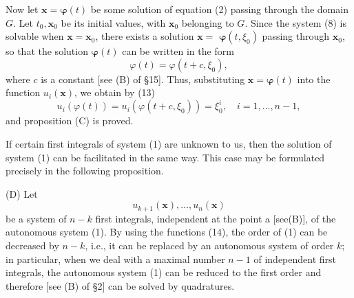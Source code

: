 \documentclass[10pt,a5paper]{book}
\theoremstyle{plain}
\theoremstyle{definition}
\theoremstyle{remark}
\begin{document}
Now let $\mathbf{x}=\boldsymbol{\varphi}(t)$ be some solution of equation (2) passing through the domain $G$. Let $t_{0}, \mathbf{x}_{0}$ be its initial values, with $\mathbf{x}_{0}$ belonging to $G$. Since the system (8) is solvable when $\mathbf{x}=\mathbf{x}_{0}$, there exists a solution $\mathbf{x}=$ $\boldsymbol{\varphi}\left(t, \xi_{0}\right)$ passing through $\mathbf{x}_{0}$, so that the solution $\boldsymbol{\varphi}(t)$ can be written in the form
\[
\varphi(t)=\varphi\left(t+c, \xi_{0}\right),
\]
where $c$ is a constant [see (B) of §15]. Thus, substituting $\mathbf{x}=\boldsymbol{\varphi}(t)$ into the function $u_{i}(\mathbf{x})$, we obtain by (13)
\[
u_{i}(\varphi(t))=u_{i}\left(\varphi\left(t+c, \xi_{0}\right)\right)=\xi_{0}^{i}, \quad i=1, \ldots, n-1,
\]
and proposition (C) is proved.

If certain first integrals of system (1) are unknown to us, then the solution of system (1) can be facilitated in the same way. This case may be formulated precisely in the following proposition.

(D) Let
\begin{equation*}
u_{k+1}(\mathbf{x}), \ldots, u_{n}(\mathbf{x}) \tag{14}
\end{equation*}
be a system of $n-k$ first integrals, independent at the point a [see(B)], of the autonomous system (1). By using the functions (14), the order of (1) can be decreased by $n-k$, i.e., it can be replaced by an autonomous system of order $k$; in particular, when we deal with a maximal number $n-1$ of independent first integrals, the autonomous system (1) can be reduced to the first order and therefore [see (B) of §2] can be solved by quadratures.
\end{document}
